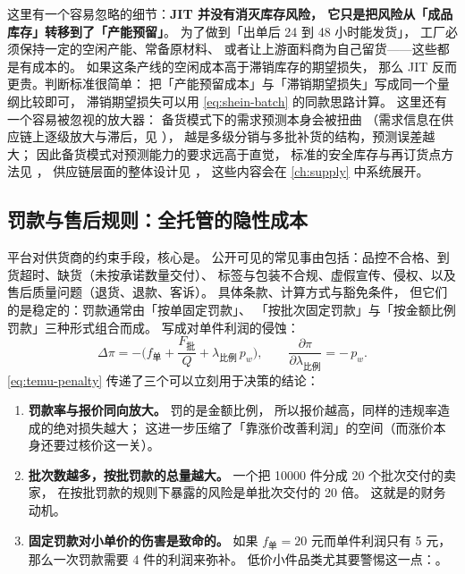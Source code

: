 这里有一个容易忽略的细节：\textbf{JIT 并没有消灭库存风险，
它只是把风险从「成品库存」转移到了「产能预留」}。
为了做到「出单后 24 到 48 小时能发货」，
工厂必须保持一定的空闲产能、常备原材料、
或者让上游面料商为自己留货——这些都是有成本的。
如果这条产线的空闲成本高于滞销库存的期望损失，
那么 JIT 反而更贵。判断标准很简单：
把「产能预留成本」与「滞销期望损失」写成同一个量纲比较即可，
滞销期望损失可以用 \cref{eq:shein-batch} 的同款思路计算。
这里还有一个容易被忽视的放大器：
备货模式下的需求预测本身会被扭曲
（需求信息在供应链上逐级放大与滞后，见 \cite{lee1997bullwhip}），
越是多级分销与多批补货的结构，预测误差越大；
因此备货模式对预测能力的要求远高于直觉，
标准的安全库存与再订货点方法见 \cite{silver1998inventory,hyndman2021forecasting}，
供应链层面的整体设计见 \cite{chopra2019supply}，
这些内容会在 \cref{ch:supply} 中系统展开。

\subsection{罚款与售后规则：全托管的隐性成本}

平台对供货商的约束手段，核心是。
公开可见的常见事由包括：品控不合格、到货超时、缺货（未按承诺数量交付）、
标签与包装不合规、虚假宣传、侵权、以及售后质量问题（退货、退款、客诉）。
具体条款、计算方式与豁免条件，
但它们的是稳定的：罚款通常由「按单固定罚款」、
「按批次固定罚款」与「按金额比例罚款」三种形式组合而成。
写成对单件利润的侵蚀：
\begin{equation}
\Delta \pi
= -\Big( f_{\text{单}} + \frac{F_{\text{批}}}{Q}
+ \lambda_{\text{比例}}\, p_{w} \Big),
\qquad
\frac{\partial \pi}{\partial \lambda_{\text{比例}}} = -\,p_{w} .
\label{eq:temu-penalty}
\end{equation}
\cref{eq:temu-penalty} 传递了三个可以立刻用于决策的结论：

\begin{enumerate}
  \item \textbf{罚款率与报价同向放大。} 罚的是金额比例，
        所以报价越高，同样的违规率造成的绝对损失越大；
        这进一步压缩了「靠涨价改善利润」的空间（而涨价本身还要过核价这一关）。
  \item \textbf{批次数越多，按批罚款的总量越大。}
        一个把 10000 件分成 20 个批次交付的卖家，
        在按批罚款的规则下暴露的风险是单批次交付的 20 倍。
        这就是的财务动机。
  \item \textbf{固定罚款对小单价的伤害是致命的。}
        如果 $f_{\text{单}} = 20$ 元而单件利润只有 5 元，
        那么一次罚款需要 4 件的利润来弥补。
        低价小件品类尤其要警惕这一点：。
\end{enumerate}

